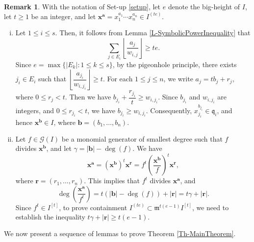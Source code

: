 \documentclass[12pt,reqno]{amsart}
\theoremstyle{definition}
\newtheorem{remark}[thm]{Remark}
\newcommand{\mi}{\mathfrak{m}}
\newcommand{\q}{\mathfrak{q}}
\newcommand{\x}{\mathbf{x}}
\newcommand{\ba}{\mathbf{a}}
\newcommand{\bb}{\mathbf{b}}
\newcommand{\br}{\mathbf{r}}
\numberwithin{equation}{section}
\begin{document}
\begin{remark}\label{R-Observation}
    With the notation of Set-up \ref{setup}, let $e$ denote the big-height of $I$, let $t \ge 1$ be an integer, and let $\x^{\ba} = x_1^{a_1} \cdots x_n^{a_n} \in I^{(te)}.$ 
    \begin{enumerate}[(i)]
        \item Let $1 \le i \le s.$ Then, it follows from Lemma \ref{L-SymbolicPowerInequality} that 
        \begin{equation}\label{INQ-3}
            \sum_{j \in E_i} \left\lfloor \dfrac{a_j}{w_{i, j}} \right\rfloor \ge te.
        \end{equation}
        Since $e = \max\{|E_k| : 1 \le k \le s\}$, by the pigeonhole principle, there exists $j_i \in E_i$ such that $\left\lfloor \dfrac{a_{j_i}}{w_{i, j_i}} \right\rfloor \ge t.$ For each $1 \le j \le n$, we write $a_j = t b_j + r_j$, where $0 \le r_j < t.$ Then we have $b_{j_i} + \dfrac{r_{j_i}}{t} \ge w_{i, j_i}.$ Since $b_{j_i}$ and $w_{i, j_i}$ are integers, and $0 \le r_{j_i} < t$, we have $b_{j_i} \ge w_{i, j_i}.$ Consequently, $x_{j_i}^{b_{j_i}} \in \q_i$, and hence $\x^{\bb} \in I$, where $\bb = (b_1, \ldots, b_n).$

        \item Let $f \in \mathcal{G}(I)$ be a monomial generator of smallest degree such that $f$ divides $\x^{\bb}$, and let $\gamma = |\bb| - \deg(f).$ We have 
        \[\x^{\ba} = (\x^{\bb})^t \x^{\mathbf{r}} = f^t \left( \dfrac{\x^{\bb}}{f} \right)^t \x^{\br},\]
        where $\br = (r_1, \ldots, r_n).$ This implies that $f^t$ divides $\x^{\ba}$, and 
        \begin{equation}\label{INQ-4}
            \deg \left( \dfrac{\x^{\ba}}{f^t} \right) = t(|\bb| - \deg(f)) + |\br| = t \gamma + |\br|.  
        \end{equation}
        Since $f^t \in I^{[t]}$, to prove containment $I^{(te)} \subset \mi^{t(e - 1)} I^{[t]}$, we need to establish the inequality $t \gamma + |\br| \ge t(e - 1).$
    \end{enumerate}
\end{remark}    
    
We now present a sequence of lemmas to prove Theorem \ref{Th-MainTheorem}. 
\end{document}
